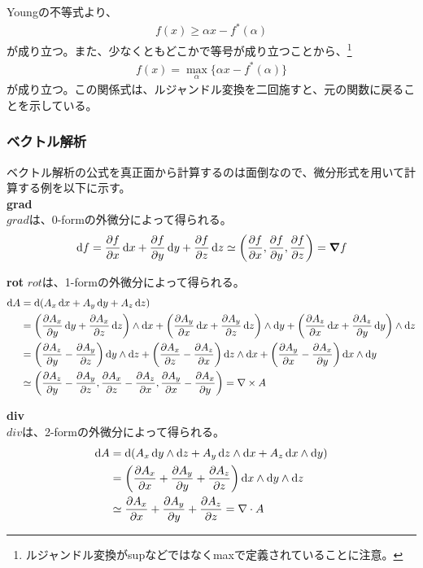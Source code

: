 \documentclass[a4paper,11pt]{jsarticle}
\numberwithin{equation}{section}
\begin{document}
Youngの不等式より、
\begin{align}
  f(x)  \geq \alpha x - f^*(\alpha)
\end{align}
が成り立つ。また、少なくともどこかで等号が成り立つことから、\footnote{ルジャンドル変換がsupなどではなくmaxで定義されていることに注意。}
\begin{align}
  f(x) = \max_{\alpha} \{\alpha x - f^*(\alpha)\}
\end{align}
が成り立つ。この関係式は、ルジャンドル変換を二回施すと、元の関数に戻ることを示している。\\


\subsubsection{ベクトル解析}
ベクトル解析の公式を真正面から計算するのは面倒なので、微分形式を用いて計算する例を以下に示す。\\
\textbf{grad}\\
$grad$は、0-formの外微分によって得られる。
\begin{align}
  \dd{f} = \pdv{f}{x}\dd{x} + \pdv{f}{y}\dd{y} +\pdv{f}{z}\dd{z} \simeq \qty(\pdv{f}{x},\pdv{f}{y},\pdv{f}{z}) = \grad{f}
\end{align}

\textbf{rot}
$rot$は、1-formの外微分によって得られる。
\begin{align}
  \dd{A} &= \dd({A_x\dd{x}}+A_y\dd{y}+A_z\dd{z} )\\
  &= \qty(\pdv{A_x}{y}\dd{y}+\pdv{A_x}{z}\dd{z} ) \wedge \dd{x} + \qty(\pdv{A_y}{x}\dd{x}+\pdv{A_y}{z}\dd{z})\wedge \dd{y} + \qty(\pdv{A_z}{x}\dd{x}+\pdv{A_z}{y}\dd{y}) \wedge \dd{z}\\
  &= \qty(\pdv{A_z}{y}-\pdv{A_y}{z})\dd{y}\wedge \dd{z} + \qty(\pdv{A_x}{z}-\pdv{A_z}{x})\dd{z}\wedge \dd{x} + \qty(\pdv{A_y}{x}-\pdv{A_x}{y})\dd{x}\wedge \dd{y}\\
  &\simeq \qty(\pdv{A_z}{y}-\pdv{A_y}{z},\pdv{A_x}{z}-\pdv{A_z}{x},\pdv{A_y}{x}-\pdv{A_x}{y}) = \nabla \times {A}
\end{align}

\textbf{div}\\
$div$は、2-formの外微分によって得られる。
\begin{align}
  \dd{A} &= \dd({A_x\dd{y}\wedge \dd{z} + A_y\dd{z}\wedge \dd{x} + A_z\dd{x}\wedge \dd{y}})\\
  &= \qty(\pdv{A_x}{x}+\pdv{A_y}{y}+\pdv{A_z}{z})\dd{x}\wedge \dd{y}\wedge \dd{z}\\
  &\simeq \pdv{A_x}{x}+\pdv{A_y}{y}+\pdv{A_z}{z} = \nabla \cdot {A}
\end{align}
\end{document}
